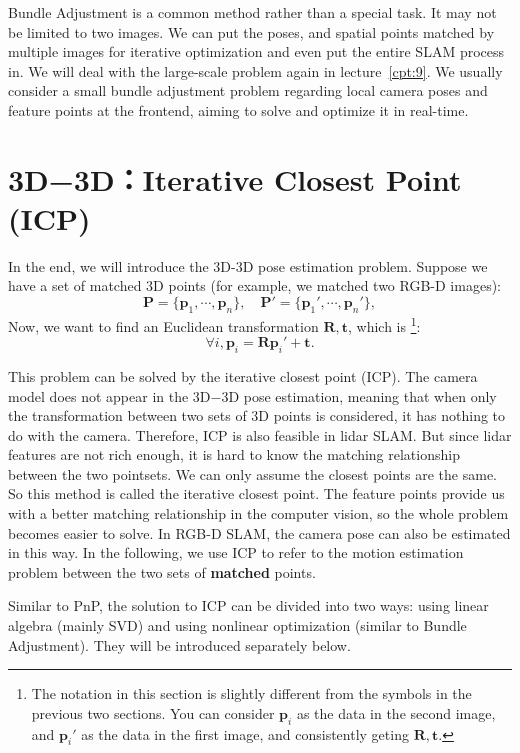 Bundle Adjustment is a common method rather than a special task. It may not be limited to two images. We can put the poses, and spatial points matched by multiple images for iterative optimization and even put the entire SLAM process in. We will deal with the large-scale problem again in lecture~\ref{cpt:9}. We usually consider a small bundle adjustment problem regarding local camera poses and feature points at the frontend, aiming to solve and optimize it in real-time.

\section{3D−3D：Iterative Closest Point (ICP)}
\label{sec:7.9}
In the end, we will introduce the 3D-3D pose estimation problem. Suppose we have a set of matched 3D points (for example, we matched two RGB-D images):
\[
\mathbf{P} = \{ \mathbf{p}_1, \cdots, \mathbf{p}_n \}, \quad \mathbf{P}' = \{ \mathbf{p}_1', \cdots, \mathbf{p}_n'\},
\]
Now, we want to find an Euclidean transformation $\mathbf{R}, \mathbf{t}$, which is \footnote{The notation in this section is slightly different from the symbols in the previous two sections. You can consider $\mathbf{p}_i$ as the data in the second image, and $\mathbf{p}_i'$ as the data in the first image, and consistently geting $ \mathbf{R},\mathbf{t}$.}:
\[
\forall i, \mathbf{p}_i = \mathbf{R} \mathbf{p}_i' + \mathbf{t}.
\]

This problem can be solved by the iterative closest point (ICP). The camera model does not appear in the 3D−3D pose estimation, meaning that when only the transformation between two sets of 3D points is considered, it has nothing to do with the camera. Therefore, ICP is also feasible in lidar SLAM. But since lidar features are not rich enough, it is hard to know the matching relationship between the two pointsets.  We can only assume the closest points are the same. So this method is called the iterative closest point. The feature points provide us with a better matching relationship in the computer vision, so the whole problem becomes easier to solve. In RGB-D SLAM, the camera pose can also be estimated in this way. In the following, we use ICP to refer to the motion estimation problem between the two sets of \textbf{matched} points.

Similar to PnP, the solution to ICP can be divided into two ways: using linear algebra (mainly SVD) and using nonlinear optimization (similar to Bundle Adjustment). They will be introduced separately below.

